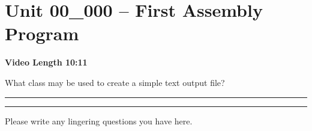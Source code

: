 \documentclass[letterpaper,12pt]{exam}
\newcommand{\unit}{Unit 00}
\begin{document}
\section*{\unit\_000 -- First Assembly Program} 
\par{\selectfont\textbf{Video Length 10:11}}
\begin{questions}
\begin{samepage}
    \question What class may be used to create a simple text output file?
    \vspace{5mm}
\end{samepage}
\hrule %



\begin{center}
    \rule{0.5\textwidth}{.4pt}
\end{center}
Please write any lingering questions you have here.
\end{questions}
\end{document}
